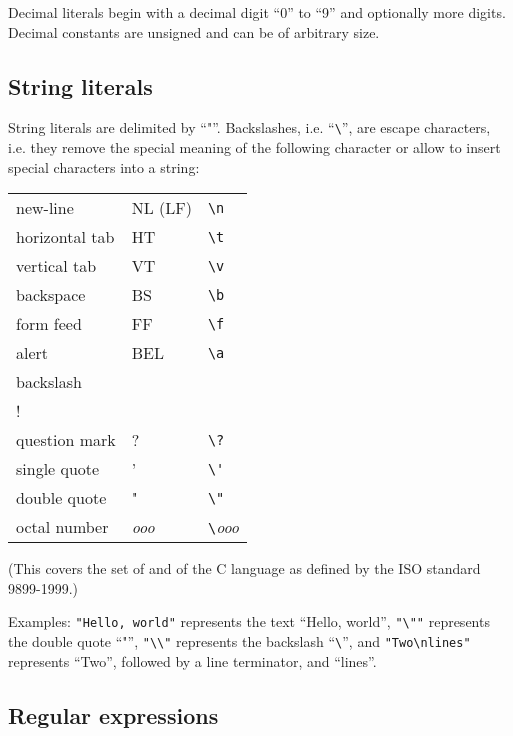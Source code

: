 Decimal literals begin with a decimal digit ``0'' to ``9'' and
optionally more digits. Decimal constants are unsigned and can
be of arbitrary size.

\subsection{String literals}

String literals are delimited by ``"''. Backslashes,
i.e. ``\lstinline!\!'',
are escape characters, i.e. they remove the special meaning of
the following character or allow to insert special characters into a
string:

\bigskip

\noindent
\begin{tabular}{| l l l |}
\hline
new-line & NL (LF) & \lstinline!\n! \\
horizontal tab & HT & \lstinline!\t! \\
vertical tab & VT & \lstinline!\v! \\
backspace & BS & \lstinline!\b! \\
form feed & FF & \lstinline!\f! \\
alert & BEL & \lstinline!\a! \\
backslash & \backslashSY{} & \lstinline!\\! \\
question mark & ? & \lstinline!\?! \\
single quote & ' & \lstinline!\'! \\
double quote & " & \lstinline!\"! \\
octal number & \textit{ooo} & \lstinline!\!\textit{ooo} \\
\hline
\end{tabular}

\bigskip

\noindent
(This covers the set of  and
 of the C language as defined
by the ISO standard 9899-1999.)

Examples: \lstinline!"Hello, world"! represents the text ``Hello, world'',
\lstinline!"\""! represents the double quote ``"'',
\lstinline!"\\"! represents the backslash ``\lstinline!\!'',
and \lstinline!"Two\nlines"! represents ``Two'', followed by
a line terminator, and ``lines''.

\subsection{Regular expressions}\label{regexlit}

